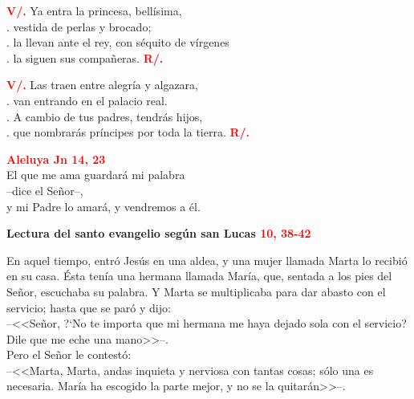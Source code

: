 \documentclass[12pt, letterpaper]{report}
\begin{document}
{\bfseries \textcolor{red}{V/.}} \hspace{1cm} Ya entra la princesa, bell\'isima, \\
. \hspace{2.5cm} vestida de perlas y brocado; \\
. \hspace{2.5cm} la llevan ante el rey, con s\'equito de v\'irgenes \\
. \hspace{2.5cm} la siguen sus compa\~neras. \hspace{1cm} {\bfseries \textcolor{red}{R/.}} \newline

\newpage

{\bfseries \textcolor{red}{V/.}} \hspace{1cm} Las traen entre alegr\'ia y algazara, \\
. \hspace{2.5cm} van entrando en el palacio real. \\
. \hspace{2.5cm} A cambio de tus padres, tendr\'as hijos, \\
. \hspace{2.5cm} que nombrar\'as pr\'incipes por toda la tierra. \hspace{1cm} {\bfseries \textcolor{red}{R/.}}

\begin{center}
\Large {\bfseries \textcolor{red}{Aleluya \hspace{1cm} Jn 14, 23}} \\
El que me ama guardar\'a mi palabra \\
--dice el Se\~nor--, \\
y mi Padre lo amar\'a, y vendremos a \'el.
\end{center}


\Huge \textcolor{red}{} \Large {\bfseries Lectura del santo evangelio seg\'un san Lucas \hspace{1cm} \textcolor{red}{10, 38-42}} \newline

\Large En aquel tiempo, entr\'o Jes\'us en una aldea, y una mujer llamada Marta lo recibi\'o en su casa. \'Esta ten\'ia una hermana llamada Mar\'ia, que, sentada a los pies del Se\~nor, escuchaba su palabra. Y Marta se multiplicaba para dar abasto con el servicio; hasta que se par\'o y dijo: \\
--<<Se\~nor, ?`No te importa que mi hermana me haya dejado sola con el servicio? Dile que me eche una mano>>--. \\
Pero el Se\~nor le contest\'o: \\
--<<Marta, Marta, andas inquieta y nerviosa con tantas cosas; s\'olo una es necesaria. Mar\'ia ha escogido la parte mejor, y no se la quitar\'an>>--. \newline
\end{document}

